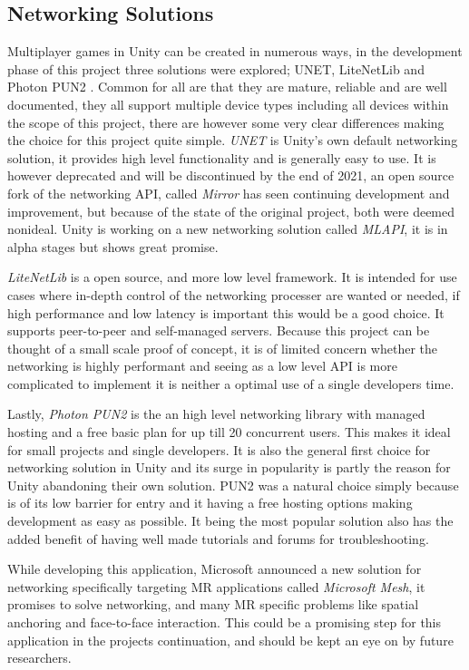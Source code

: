 \subsection*{Networking Solutions}

Multiplayer games in Unity can be created in numerous ways, in the development phase of this project three solutions were explored; UNET,  LiteNetLib and Photon PUN2 . Common for all are that they are mature, reliable and are well documented, they all support multiple device types including all devices within the scope of this project, there are however some very clear differences making the choice for this project quite simple.
\textit{UNET} is Unity's own default networking solution, it provides high level functionality and is generally easy to use. It is however deprecated and will be discontinued by the end of 2021, an open source fork of the networking API, called \textit{Mirror} has seen continuing development and improvement, but because of the state of the original project, both were deemed nonideal. Unity is working on a new networking solution called \textit{MLAPI}, it is in alpha stages but shows great promise.

\textit{LiteNetLib} is a open source, and more low level framework. It is intended for use cases where in-depth control of the networking processer are wanted or needed, if high performance and low latency is important this would be a good choice. It supports peer-to-peer and self-managed servers. Because this project can be thought of a small scale proof of concept, it is of limited concern whether the networking is highly performant and seeing as a low level API is more complicated to implement it is neither a optimal use of a single developers time.

Lastly, \textit{Photon PUN2} is the an high level networking library with managed hosting and a free basic plan for up till 20 concurrent users. This makes it ideal for small projects and single developers. It is also the general first choice for networking solution in Unity and its surge in popularity is partly the reason for Unity abandoning their own solution. PUN2 was a natural choice simply because is of its low barrier for entry and it having a free hosting options making development as easy as possible. It being the most popular solution also has the added benefit of having well made tutorials and forums for troubleshooting.

While developing this application, Microsoft announced a new solution for networking specifically targeting MR applications called \textit{Microsoft Mesh}, it promises to solve networking, and many MR specific problems like spatial anchoring and face-to-face interaction. This could be a promising step for this application in the projects continuation, and should be kept an eye on by future researchers.

